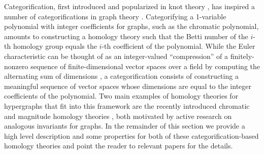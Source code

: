 \documentclass{amsart}
\begin{document}
Categorification, first introduced and popularized in knot theory \cite{khovanov1999categorification, bar2002khovanov}, has inspired a number of categorifications in graph theory \cite{chandler2023strength, eastwood2007euler, HGR2005, HGRArb2005, sazdanovic2018categorification}. 
Categorifying a 1-variable polynomial with integer coefficients for graphs, such as the chromatic polynomial, amounts to constructing a homology theory such that the Betti number of the $i$-th homology group equals the $i$-th coefficient of the polynomial. 
While the Euler characteristic can be thought of as an integer-valued ``compression'' of a finitely-nonzero sequence of finite-dimensional
vector spaces over a field  by computing the alternating sum of dimensions \cite{ghrist2018persistent}, a categorification consists of constructing a meaningful sequence of vector spaces whose dimensions are equal to the integer coefficients of the polynomial. Two main examples of homology theories for hypergraphs that fit into this framework are the recently introduced chromatic and magnitude homology theories \cite{aslam2023categorifying,bi2024magnitude}, both motivated by active research on analogous invariants for graphs.
In the remainder of this section we provide a high level description and some properties for both of these categorification-based homology theories and point the reader to relevant papers for the details. 
\end{document}
